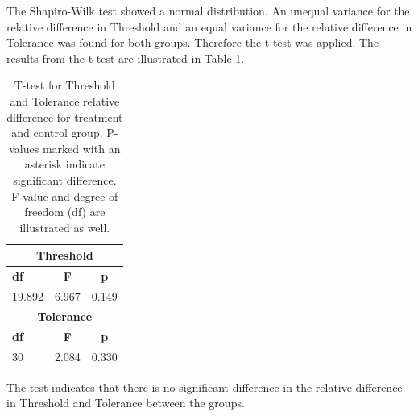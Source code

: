 The Shapiro-Wilk test showed a normal distribution. An unequal variance for the relative difference in Threshold and an equal variance for the relative difference in Tolerance was found for both groups. Therefore the t-test was applied. The results from the t-test are illustrated in Table \ref{table:TTEST}. 

\begin{table}[ht]
\caption{T-test for Threshold and Tolerance relative difference for treatment and control group. P-values marked with an asterisk indicate significant difference. F-value and degree of
freedom (df) are illustrated as well.}
\centering
\begin{tabular}{l c c} 
\toprule
\multicolumn{3}{c}{\textbf{Threshold}} \\
\midrule  
\textbf{df} & \textbf{F} & \textbf{p} \\ [0.5ex] %
19.892 & 6.967 & 0.149    \\
\toprule
\multicolumn{3}{c}{\textbf{Tolerance}} \\
\midrule 
\textbf{df} & \textbf{F} & \textbf{p} \\ [0.5ex] %
30 & 2.084 & 0.330 \\
\hline
\end{tabular}
\label{table:TTEST}
\end{table}

\noindent
The test indicates that there is no significant difference in the relative difference in Threshold and Tolerance between the groups.
